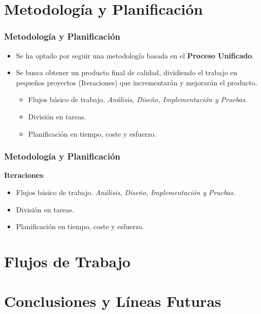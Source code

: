 \documentclass{beamer}
\begin{document}
\section{Metodología y Planificación}

\begin{frame}
\frametitle{Metodología y Planificación}
\begin{itemize}
\item Se ha optado por seguir una metodología basada en el \textbf{Proceso Unificado}.
\item Se busca obtener un producto final de calidad, dividiendo el trabajo en pequeños proyectos (Iteraciones) que incrementarán y mejorarán el producto. 
\begin{itemize}
\item Flujos básico de trabajo. \textit{Análisis, Diseño, Implementación y Pruebas}.
\item División en tareas.
\item Planificación en tiempo, coste y esfuerzo.
\end{itemize}
\end{itemize}
\end{frame}


\begin{frame}
\frametitle{Metodología y Planificación}
\textbf{Iteraciones}:
\begin{itemize}
\item Flujos básico de trabajo. \textit{Análisis, Diseño, Implementación y Pruebas}.
\item División en tareas.
\item Planificación en tiempo, coste y esfuerzo.
\end{itemize}
\end{frame}



\section{Flujos de Trabajo}
\begin{frame}


\end{frame}

\section{Conclusiones y Líneas Futuras}
\begin{frame}

\end{frame}
 
\end{document}
